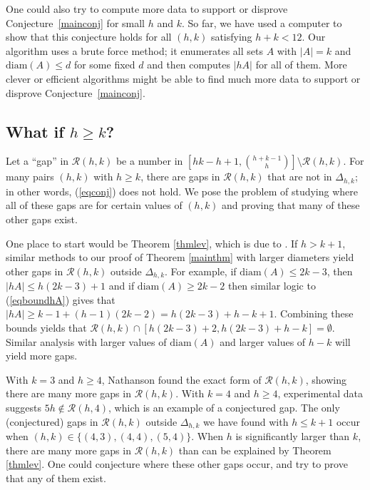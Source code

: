 \documentclass{daj}
\theoremstyle{definition}
\theoremstyle{remark}
\numberwithin{equation}{section}
\numberwithin{theorem}{section}
\newcommand{\calr}{\mathcal{R}}
\newcommand{\diam}{\mathrm{diam}}
\begin{document}
One could also try to compute more data to support or disprove Conjecture~\ref{mainconj} for small $h$ and $k$. So far, we have used a computer to show that this conjecture holds for all $(h,k)$ satisfying $h+k < 12$. Our algorithm uses a brute force method;  it enumerates all sets $A$ with $|A| = k$ and $\text{diam}(A) \leq d$ for some fixed $d$ and then computes $|hA|$ for all of them. More clever or efficient algorithms might be able to find much more data to support or disprove Conjecture~\ref{mainconj}.
\subsection{What if \texorpdfstring{$h \geq k$}{h > k}?}\label{secthgeqk}
Let a ``gap'' in $\calr(h,k)$ be a number in $\left[hk-h+1,\binom{h+k-1}{h}\right]\setminus \calr(h,k)$. For many pairs $(h,k)$ with $h \geq k$, there are gaps in $\calr(h,k)$ that are not in $\Delta_{h,k}$; in other words, (\ref{eqconj}) does not hold. We pose the problem of studying where all of these gaps are for certain values of $(h,k)$ and proving that many of these other gaps exist.

One place to start would be Theorem \ref{thmlev}, which is due to \cite{Lev96}. If $h > k+1$, similar methods to our proof of Theorem \ref{mainthm} with larger diameters yield other gaps in $\calr(h,k)$ outside $\Delta_{h,k}$. For example, if $\diam(A) \leq 2k-3$, then $|hA| \leq h(2k-3) + 1$ and if $\diam(A) \geq 2k-2$ then similar logic to (\ref{eqboundhA}) gives that $|hA| \geq k-1 + (h-1)(2k-2) = h(2k-3) + h-k+1$. Combining these bounds yields that $\calr(h,k) \cap [h(2k-3)+2,h(2k-3)+h-k] = \emptyset$. Similar analysis with larger values of $\diam(A)$ and larger values of $h-k$ will yield more gaps. 

With $k=3$ and $h \geq 4$, Nathanson \cite[Theorem 9]{nathanson25Problems} found the exact form of $\calr(h,k)$, showing there are many more gaps in $\calr(h,k)$. With $k=4$ and $h \geq 4$, experimental data suggests $5h \not \in \calr(h,4)$, which is an example of a conjectured gap. The only (conjectured) gaps in $\calr(h,k)$ outside $\Delta_{h,k}$ we have found with $h \leq k+1$ occur when $(h,k) \in \{(4,3),(4,4),(5,4)\}$. When $h$ is significantly larger than $k$, there are many more gaps in $\calr(h,k)$ than can be explained by Theorem \ref{thmlev}. One could conjecture where these other gaps occur, and try to prove that any of them exist. 
\end{document}
